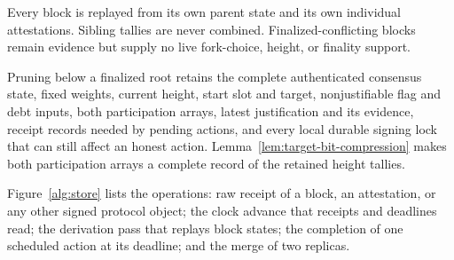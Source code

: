 \ifx\litemode\undefined\documentclass{article}\fi
\theoremstyle{plain}
\theoremstyle{definition}
\theoremstyle{remark}
\begin{document}
Every block is replayed from its own parent state and its own individual
attestations.  Sibling tallies are never combined.  Finalized-conflicting
blocks remain evidence but supply no live fork-choice, height, or finality
support.

Pruning below a finalized root retains the complete authenticated consensus
state, fixed weights, current height, start slot and target, nonjustifiable
flag and debt inputs, both participation arrays, latest justification and its
evidence, receipt records needed by pending actions, and every local durable
signing lock that can still affect an honest action.
Lemma~\ref{lem:target-bit-compression} makes both participation arrays a
complete record of the retained height tallies.

Figure~\ref{alg:store} lists the operations: raw receipt of a block,
an attestation, or any other signed protocol object; the clock advance
that receipts and deadlines read; the derivation pass that replays block
states; the completion of one scheduled action at its deadline; and the
merge of two replicas.
\end{document}
